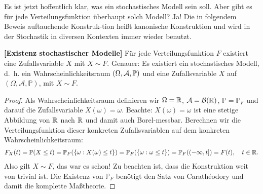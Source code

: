 Es ist jetzt hoffentlich klar, was ein stochastisches Modell sein soll. Aber gibt es f\"ur jede Verteilungsfunktion \"uberhaupt solch Modell? Ja! Die in folgendem Beweis auftauchende Konstruk-tion hei\ss t \glqq kanonische Konstruktion\grqq{} und wird in der Stochastik in diversen Kontexten immer wieder benutzt.
\begin{satz}\label{existenz}
 \textbf{[Existenz stochastischer Modelle]}
	Für jede Verteilungsfunktion $F$ existiert eine Zufallsvariable $X$ mit $X\sim F$. Genauer: Es existiert ein stochastisches Modell, \mbox{d. h.} ein Wahrscheinlichkeitsraum $(\Omega, \mathcal{A}, \mathbb{P})$ und eine Zufallsvariable $X$ auf $(\Omega, \mathcal A, \mathbb P)$, mit $X \sim F$.
\end{satz}

\begin{proof}
	Als Wahrscheinlichkeitsraum definieren wir $\Omega=\mathbb{R}$, $\mathcal{A} = \mathcal{B}(\mathbb{R})$, $\mathbb{P} = \mathbb{P}_F$ und darauf die Zufallsvariable $X(\omega) = \omega$. Beachte: $X(\omega)=\omega$ ist eine stetige Abbildung von $\mathbb{R}$ nach $\mathbb{R}$ und damit auch Borel-messbar. Berechnen wir die Verteilungsfunktion dieser konkreten Zufallsvariablen auf dem konkreten Wahrscheinlichkeitsraum:
		\begin{align*}
		F_X(t)=\mathbb P(X\leq t)=\mathbb P_F(\{\omega: X(\omega)\leq t\})=\mathbb P_F(\{\omega: \omega\leq t\})=\mathbb P_F((-\infty,t])=F(t),\quad t\in\mathbb{R}.
	\end{align*}
%	
	Also gilt $X\sim F$, das war es schon! Zu beachten ist, dass die Konstruktion weit von trivial ist. Die Existenz von $\mathbb P_F$ ben\"otigt den Satz von Carath\'eodory und damit die komplette Ma\ss theorie. 
\end{proof}

